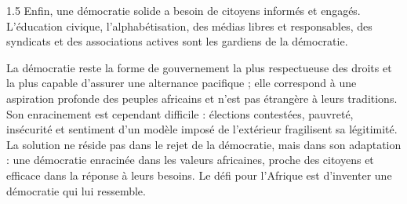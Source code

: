\documentclass[12pt]{article}
\begin{document}
\begin{spacing}{1.5}
Enfin, une démocratie solide a besoin de citoyens informés et engagés. L'éducation civique, l'alphabétisation, des médias libres et responsables, des syndicats et des associations actives sont les gardiens de la démocratie.


La démocratie reste la forme de gouvernement la plus respectueuse des droits et la plus capable d'assurer une alternance pacifique ; elle correspond à une aspiration profonde des peuples africains et n'est pas étrangère à leurs traditions. Son enracinement est cependant difficile : élections contestées, pauvreté, insécurité et sentiment d'un modèle imposé de l'extérieur fragilisent sa légitimité. La solution ne réside pas dans le rejet de la démocratie, mais dans son adaptation : une démocratie enracinée dans les valeurs africaines, proche des citoyens et efficace dans la réponse à leurs besoins. Le défi pour l'Afrique est d'inventer une démocratie qui lui ressemble.

\end{spacing}
\end{document}
